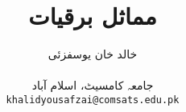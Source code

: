 \documentclass[leqno,b5paper]{book}
\author{
خالد خان یوسفزئی\\
\\
{\small {جامعہ کامسیٹ، اسلام آباد}}\\
\texttt{khalidyousafzai@comsats.edu.pk}
}
\title{مماثل برقیات}
\date{}                           %
\begin{document}
\begin{urdufont}

\renewcommand*{\contentsname}{عنوان}    %

\frontmatter                          %

\maketitle

\tableofcontents
\pagestyle{empty}




\mainmatter                      %

\pagestyle{headings}












%
%
%
%
%
%


\backmatter

\renewcommand*{\indexname}{فرہنگ}      %
\cleardoublepage
{}
\printindex


\end{urdufont}
\end{document}
